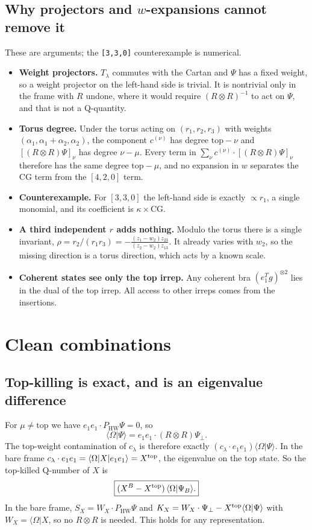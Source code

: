 \documentclass[11pt]{article}
\newcommand{\bra}[1]{\langle #1|}
\newcommand{\ket}[1]{|#1\rangle}
\newcommand{\Om}{\Omega}
\newcommand{\HW}{\mathrm{HW}}
\begin{document}
\subsection{Why projectors and $w$-expansions cannot remove it}
These are arguments; the \texttt{[3,3,0]} counterexample is numerical.
\begin{itemize}
\item \textbf{Weight projectors.} $T_\lambda$ commutes with the Cartan and $\Psi$ has a fixed weight, so a weight projector on the left-hand side is trivial. It is nontrivial only in the frame with $R$ undone, where it would require $(R\otimes R)^{-1}$ to act on $\Psi$, and that is not a Q-quantity.
\item \textbf{Torus degree.} Under the torus acting on $(r_1,r_2,r_3)$ with weights $(\alpha_1,\alpha_1+\alpha_2,\alpha_2)$, the component $c^{(\nu)}$ has degree $\mathrm{top}-\nu$ and $[(R\otimes R)\Psi]_\nu$ has degree $\nu-\mu$. Every term in $\sum_\nu c^{(\nu)}\cdot[(R\otimes R)\Psi]_\nu$ therefore has the same degree $\mathrm{top}-\mu$, and no expansion in $w$ separates the CG term from the $[4,2,0]$ term.
\item \textbf{Counterexample.} For $[3,3,0]$ the left-hand side is exactly $\propto r_1$, a single monomial, and its coefficient is $\kappa\times$CG.
\item \textbf{A third independent $r$ adds nothing.} Modulo the torus there is a single invariant, $\rho=r_2/(r_1r_3)=-\frac{(z_1-w_2)z_{23}}{(z_2-w_2)z_{13}}$. It already varies with $w_2$, so the missing direction is a torus direction, which acts by a known scale.
\item \textbf{Coherent states see only the top irrep.} Any coherent bra $(e_1^Tg)^{\otimes2}$ lies in the dual of the top irrep. All access to other irreps comes from the insertions.
\end{itemize}

\section{Clean combinations}

\subsection{Top-killing is exact, and is an eigenvalue difference}
For $\mu\neq\mathrm{top}$ we have $e_1e_1\cdot P_\HW\Psi=0$, so
\[
\langle\Om|\Psi\rangle=e_1e_1\cdot(R\otimes R)\Psi_\perp .
\]
The top-weight contamination of $c_\lambda$ is therefore exactly $(c_\lambda\cdot e_1e_1)\langle\Om|\Psi\rangle$. In the bare frame $c_\lambda\cdot e_1e_1=\bra\Om X\ket{e_1e_1}=X^{\rm top}$, the eigenvalue on the top state. So the top-killed Q-number of $X$ is
\[
\boxed{(X^B-X^{\rm top})\,\langle\Om|\Psi_B\rangle .}
\]
In the bare frame, $S_X=W_X\cdot P_\HW\Psi$ and $K_X=W_X\cdot\Psi_\perp-X^{\rm top}\langle\Om|\Psi\rangle$ with $W_X=\bra\Om X$, so no $R\otimes R$ is needed. This holds for any representation.
\end{document}
